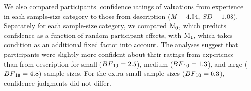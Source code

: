 \documentclass[a4paper, man, floatsintext]{apa6}
\begin{document}
We also compared participants' confidence ratings of valuations from
experience in each sample-size category to those from description
(\(M = 4.04\), \(SD = 1.08\)). Separately for each sample-size category,
we compared \(\mathrm{M}\textsubscript{0}\), which predicts confidence
as a function of random participant effects, with
\(\mathrm{M}\textsubscript{1}\), which takes condition as an additional
fixed factor into account. The analyses suggest that participants were
slightly more confident about their ratings from experience than from
description for small (\(BF\textsubscript{10} = 2.5\)), medium
(\(BF\textsubscript{10} = 1.3\)), and large
(\(BF\textsubscript{10} = 4.8\)) sample sizes. For the extra small
sample sizes (\(BF\textsubscript{10} = 0.3\)), confidence judgments did
not differ.
\end{document}
